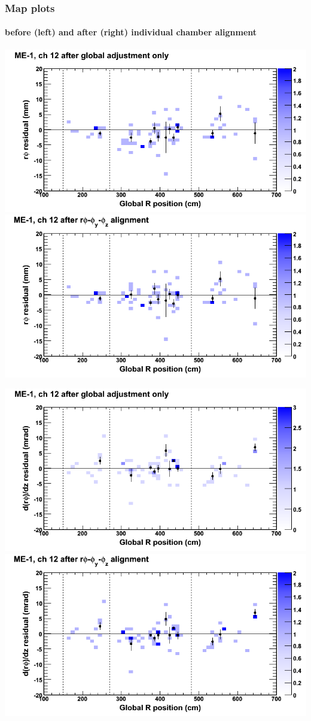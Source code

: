 \documentclass[compress]{beamer}
\begin{document}
\begin{frame}
\frametitle{Map plots}
\framesubtitle{before (left) and after (right) individual chamber alignment}
\includegraphics[width=0.5\linewidth]{ringmapplots_3dof/before_CSCvsr_mem1ch12_x.png} \includegraphics[width=0.5\linewidth]{ringmapplots_3dof/after_CSCvsr_mem1ch12_x.png}

\includegraphics[width=0.5\linewidth]{ringmapplots_3dof/before_CSCvsr_mem1ch12_dxdz.png} \includegraphics[width=0.5\linewidth]{ringmapplots_3dof/after_CSCvsr_mem1ch12_dxdz.png}
\end{frame}
\end{document}

